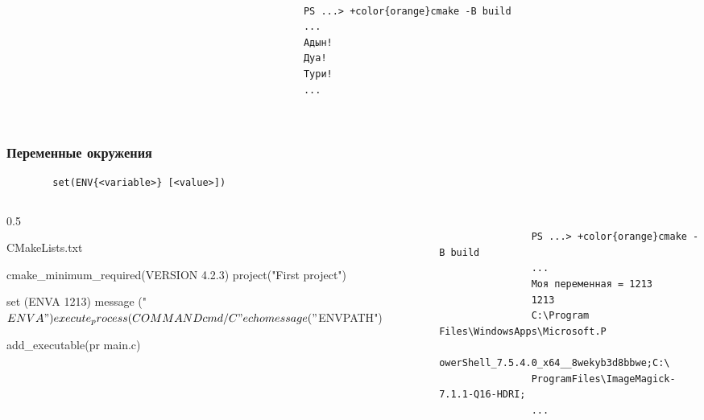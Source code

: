 \documentclass[10pt, aspectratio=1610]{beamer}
\begin{document}
\begin{frame}[fragile]
\begin{columns}[]
\begin{column}{\colA\linewidth}
		\end{column}
		
		\begin{column}{\linewidth}
			\begin{Verbatim}[bgcolor=black,tabsize=4,formatcom=\color{white},gobble=4,fontsize=\footnotesize, xleftmargin=0em, frame=single,framerule=0pt ,rulecolor=\color{red},framesep=1em,fillcolor=\color{black},commandchars=+\{\}]
				
				PS ...> +color{orange}cmake -B build
				...
				Адын!
				Дуа!
				Тури!
				...
				
			\end{Verbatim}
		\end{column}
	\end{columns}	
\end{frame}


\begin{frame}[fragile]\frametitle{Переменные окружения}
	
	\begin{verbatim}
		set(ENV{<variable>} [<value>])
	\end{verbatim}
	
	\begin{columns}[]
		\edef\colA{0.5}
		\begin{column}{\colA\linewidth}
			\begin{block}{CMakeLists.txt}
			\begin{cmakecode}
				cmake_minimum_required(VERSION 4.2.3)
				project("First project")				
				
				set  (ENV{A} 1213)				
				message ("$ENV{A}")		
						
				execute_process(COMMAND cmd /C "echo %
								
				message("$ENV{PATH}")
				
				add_executable(pr main.c)
			\end{cmakecode}
			\end{block}
		\end{column}
		\begin{column}{\fpeval{1-\colA}\linewidth}
			\begin{Verbatim}[bgcolor=black,tabsize=4,formatcom=\color{white},gobble=4,fontsize=\footnotesize, xleftmargin=0em, frame=single,framerule=0pt ,rulecolor=\color{red},framesep=1em,fillcolor=\color{black},commandchars=+\{\}]
				
				PS ...> +color{orange}cmake -B build
				...
				Моя переменная = 1213
				1213
				C:\Program Files\WindowsApps\Microsoft.P
				owerShell_7.5.4.0_x64__8wekyb3d8bbwe;C:\
				ProgramFiles\ImageMagick-7.1.1-Q16-HDRI;
				...
				
			\end{Verbatim}
		\end{column}
	\end{columns}
	
\end{frame}
\end{document}
